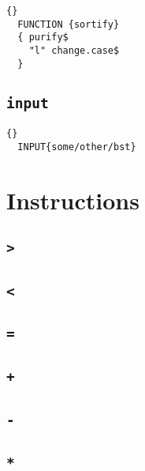 \INCOMPLETE

\begin{lstlisting}{}
  FUNCTION {sortify}
  { purify$
    "l" change.case$
  }
\end{lstlisting}


\subsection{\texttt{input}}

\INCOMPLETE

\begin{lstlisting}{}
  INPUT{some/other/bst}
\end{lstlisting}

\section{Instructions}

\subsection{\texttt{>}}

\INCOMPLETE

\subsection{\texttt{<}}

\INCOMPLETE

\subsection{\texttt{=}}

\INCOMPLETE

\subsection{\texttt{+}}

\INCOMPLETE

\subsection{\texttt{-}}

\INCOMPLETE

\subsection{\texttt{*}}

\INCOMPLETE

